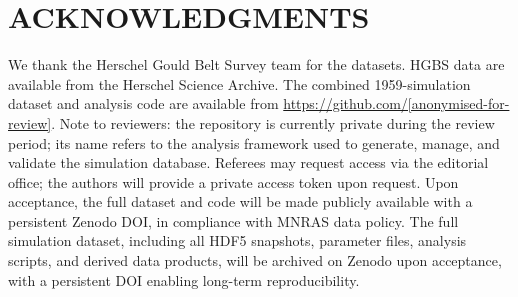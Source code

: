 \documentclass[twoside,twocolumn]{mnras}
\begin{document}
\section*{ACKNOWLEDGMENTS}

We thank the Herschel Gould Belt Survey team for the datasets. HGBS data are available
from the Herschel Science Archive. The combined 1959-simulation dataset and analysis code are available from
\url{https://github.com/[anonymised-for-review]}. Note to reviewers: the repository is currently private during the review period; its name refers to the analysis framework used to generate, manage, and validate the simulation database.
Referees may request access via the editorial office; the authors will provide a
private access token upon request. Upon acceptance, the full dataset and code will
be made publicly available with a persistent Zenodo DOI, in compliance with MNRAS
data policy. The full simulation
dataset, including all HDF5 snapshots, parameter files, analysis scripts, and derived
data products, will be archived on Zenodo upon acceptance, with a persistent DOI enabling
long-term reproducibility.



\end{document}
